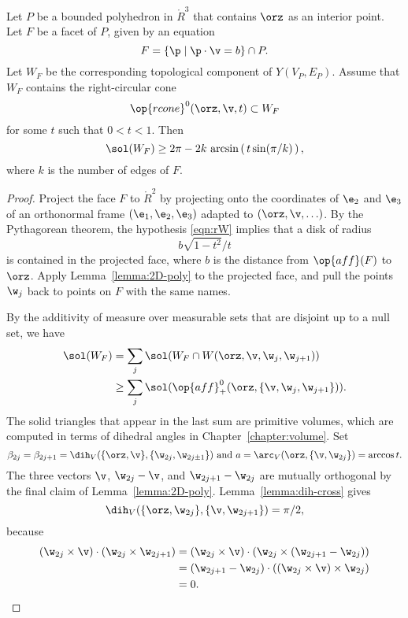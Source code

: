 \begin{lemma}[]\label{lemma:ngon} 
  Let $P$ be a bounded polyhedron in $\ring{R}^3$ that contains $\orz$
  as an interior point.  Let $F$ be a facet of $P$, given by an
  equation
\[  
F = \{\p \mid \p \cdot \v = b\} \cap P.
\]  
Let $W_F$ be the corresponding topological component of $Y(V_P,E_P)$.
Assume that $W_F$ contains the right-circular cone
\begin{equation}\label{eqn:rW}
\op{rcone}^0(\orz,\v,t) \subset W_F
\end{equation}
for some $t$ such that $0<t<1$.
Then 
\[  
\sol(W_F) \ge 
2\pi - 2 k \,\arcsin\left(\,t\sin(\pi/k)\,\right),
\] 
where $k$ is the number of edges of $F$.
\end{lemma}

\begin{proof}
  Project the face $F$ to $\ring{R}^2$ by  projecting onto
  the coordinates of $\e_2$ and $\e_3$ of  an orthonormal frame
  $(\e_1,\e_2,\e_3)$ adapted to $(\orz,\v,\ldots)$.  By the Pythagorean theorem,
  the hypothesis \eqref{eqn:rW} implies that a disk of radius
\[
b \sqrt{1-t^2}/t
\]
is contained in the projected face, where $b$ is the distance from
$\op{aff}(F)$ to $\orz$.  Apply Lemma~\ref{lemma:2D-poly} to the
projected face, and pull the points $\w_j$ back to points on $F$ with the same names.

By the additivity of measure over measurable sets that are disjoint up
to a null set, we have
\begin{align*}
\sol(W_F) &= \sum_j \sol(W_F \cap W(\orz,\v,\w_j,\w_{j+1}))\\
  &\ge \sum_j \sol(\op{aff}_+^0(\orz,\{\v,\w_j,\w_{j+1}\})).
\end{align*}
The solid triangles that appear in the last sum are primitive volumes,
which are computed in terms of
dihedral angles  in Chapter~\ref{chapter:volume}.  Set
\[
\beta_{2j}=\beta_{2j+1}=\dih_V(\{\orz,\v\},\{\w_{2j},\w_{2j\pm1}\}) \text{ and }
a = \arc_V(\orz,\{\v,\w_{2j}\}) = \arccos t.
\]
The three vectors $\v$, $\w_{2j}-\v$, and $\w_{2j+1}-\w_{2j}$ are
mutually orthogonal by the final claim of Lemma~\ref{lemma:2D-poly}.
Lemma~\ref{lemma:dih-cross} gives
\[
\dih_V(\{\orz,\w_{2j}\},\{\v,\w_{2j+1}\}) =\pi/2,
\]
because
\begin{align*}
(\w_{2j} \times \v)\cdot (\w_{2j}\times \w_{2j+1}) &=
(\w_{2j} \times \v)\cdot (\w_{2j}\times (\w_{2j+1}-\w_{2j}))\\
 &=  (\w_{2j+1}-\w_{2j})\cdot ((\w_{2j} \times \v)\times \w_{2j})\\
&= 0.
\end{align*}


\end{proof}
